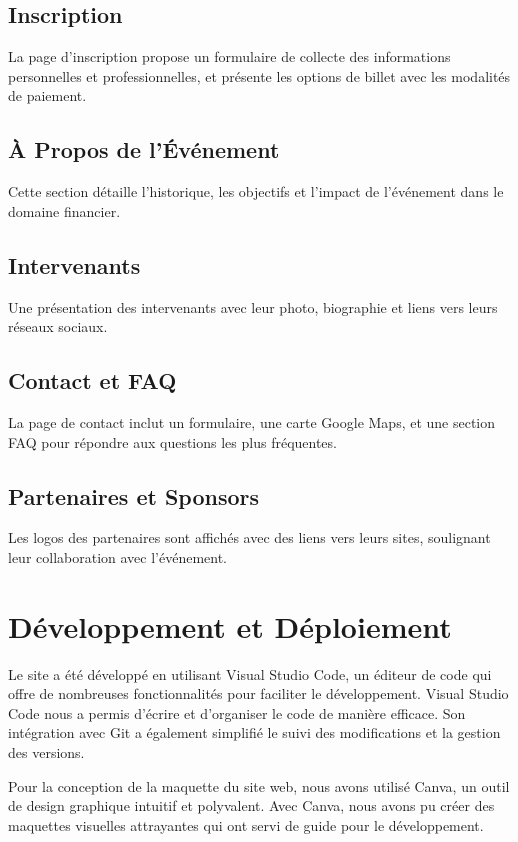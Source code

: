 \documentclass[12pt,twoside,letterpaper]{article}
\begin{document}
\begin{Large}
\subsection{Inscription}
La page d’inscription propose un formulaire de collecte des informations personnelles et professionnelles, et présente les options de billet avec les modalités de paiement.

\subsection{À Propos de l'Événement}
Cette section détaille l'historique, les objectifs et l'impact de l’événement dans le domaine financier.

\subsection{Intervenants}
Une présentation des intervenants avec leur photo, biographie et liens vers leurs réseaux sociaux.

\subsection{Contact et FAQ}
La page de contact inclut un formulaire, une carte Google Maps, et une section FAQ pour répondre aux questions les plus fréquentes.

\subsection{Partenaires et Sponsors}
Les logos des partenaires sont affichés avec des liens vers leurs sites, soulignant leur collaboration avec l’événement.


\section{Développement et Déploiement}

Le site a été développé en utilisant Visual Studio Code, un éditeur de code qui offre de nombreuses fonctionnalités pour faciliter le développement. Visual Studio Code nous a permis d'écrire et d'organiser le code de manière efficace. Son intégration avec Git a également simplifié le suivi des modifications et la gestion des versions.

\vspace{0.5cm}

Pour la conception de la maquette du site web, nous avons utilisé Canva, un outil de design graphique intuitif et polyvalent. Avec Canva, nous avons pu créer des maquettes visuelles attrayantes qui ont servi de guide pour le développement.


\end{Large}
\end{document}
